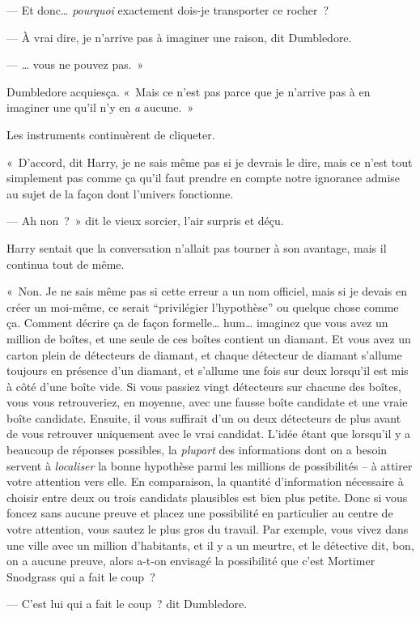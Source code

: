 --- Et donc… \emph{pourquoi} exactement dois-je transporter ce rocher~?

--- À vrai dire, je n'arrive pas à imaginer une raison, dit Dumbledore.

--- … vous ne pouvez pas.~»

Dumbledore acquiesça. «~Mais ce n'est pas parce que je n'arrive pas à en imaginer une qu'il n'y en \emph{a} aucune.~»

Les instruments continuèrent de cliqueter.

«~D'accord, dit Harry, je ne sais même pas si je devrais le dire, mais ce n'est tout simplement pas comme ça qu'il faut prendre en compte notre ignorance admise au sujet de la façon dont l'univers fonctionne.

--- Ah non~?~» dit le vieux sorcier, l'air surpris et déçu.

Harry sentait que la conversation n'allait pas tourner à son avantage, mais il continua tout de même.

«~Non. Je ne sais même pas si cette erreur a un nom officiel, mais si je devais en créer un moi-même, ce serait “privilégier l'hypothèse” ou quelque chose comme ça. Comment décrire ça de façon formelle… hum… imaginez que vous avez un million de boîtes, et une seule de ces boîtes contient un diamant. Et vous avez un carton plein de détecteurs de diamant, et chaque détecteur de diamant s'allume toujours en présence d'un diamant, et s'allume une fois sur deux lorsqu'il est mis à côté d'une boîte vide. Si vous passiez vingt détecteurs sur chacune des boîtes, vous vous retrouveriez, en moyenne, avec une fausse boîte candidate et une vraie boîte candidate. Ensuite, il vous suffirait d'un ou deux détecteurs de plus avant de vous retrouver uniquement avec le vrai candidat. L'idée étant que lorsqu'il y a beaucoup de réponses possibles, la \emph{plupart} des informations dont on a besoin servent à \emph{localiser} la bonne hypothèse parmi les millions de possibilités -- à attirer votre attention vers elle. En comparaison, la quantité d'information nécessaire à choisir entre deux ou trois candidats plausibles est bien plus petite. Donc si vous foncez sans aucune preuve et placez une possibilité en particulier au centre de votre attention, vous sautez le plus gros du travail. Par exemple, vous vivez dans une ville avec un million d'habitants, et il y a un meurtre, et le détective dit, bon, on a aucune preuve, alors a-t-on envisagé la possibilité que c'est Mortimer Snodgrass qui a fait le coup~?

--- C'est lui qui a fait le coup~? dit Dumbledore.

